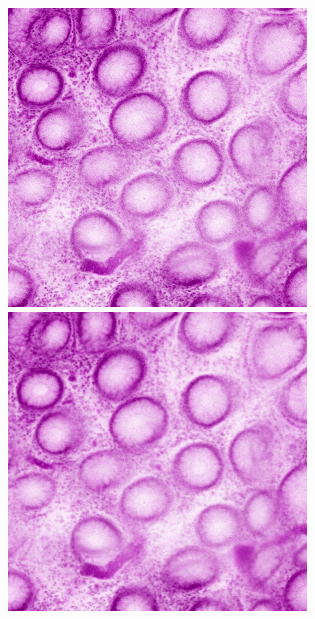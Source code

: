 \begin{figure}[H]
	\centering
	
	\begin{minipage}{0.24\columnwidth}
		\centering
		\includegraphics[clip, width=\linewidth]{fig/preprocessing/data_aug/color/blur/blur_0_00}
	\end{minipage}
	\begin{minipage}{0.24\columnwidth}
		\centering
		\includegraphics[clip, width=\linewidth]{fig/preprocessing/data_aug/color/blur/blur_0_50}

\end{minipage}
\end{figure}
